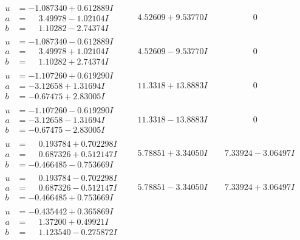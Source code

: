 \documentclass[1p]{elsarticle_modified}
\theoremstyle{definition}
\begin{document}
$$\begin{array}{c|c|c}
\begin{aligned}
u &= -1.087340 + 0.612889 I \\
a &= \phantom{-}3.49978 - 1.02104 I \\
b &= \phantom{-}1.10282 - 2.74374 I\end{aligned}
 & \phantom{-}4.52609 + 9.53770 I & \phantom{-0.000000 } 0 \\ \hline\begin{aligned}
u &= -1.087340 - 0.612889 I \\
a &= \phantom{-}3.49978 + 1.02104 I \\
b &= \phantom{-}1.10282 + 2.74374 I\end{aligned}
 & \phantom{-}4.52609 - 9.53770 I & \phantom{-0.000000 } 0 \\ \hline\begin{aligned}
u &= -1.107260 + 0.619290 I \\
a &= -3.12658 + 1.31694 I \\
b &= -0.67475 + 2.83005 I\end{aligned}
 & \phantom{-}11.3318 + 13.8883 I & \phantom{-0.000000 } 0 \\ \hline\begin{aligned}
u &= -1.107260 - 0.619290 I \\
a &= -3.12658 - 1.31694 I \\
b &= -0.67475 - 2.83005 I\end{aligned}
 & \phantom{-}11.3318 - 13.8883 I & \phantom{-0.000000 } 0 \\ \hline\begin{aligned}
u &= \phantom{-}0.193784 + 0.702298 I \\
a &= \phantom{-}0.687326 + 0.512147 I \\
b &= -0.466485 - 0.753669 I\end{aligned}
 & \phantom{-}5.78851 + 3.34050 I & \phantom{-}7.33924 - 3.06497 I \\ \hline\begin{aligned}
u &= \phantom{-}0.193784 - 0.702298 I \\
a &= \phantom{-}0.687326 - 0.512147 I \\
b &= -0.466485 + 0.753669 I\end{aligned}
 & \phantom{-}5.78851 - 3.34050 I & \phantom{-}7.33924 + 3.06497 I \\ \hline\begin{aligned}
u &= -0.435442 + 0.365869 I \\
a &= \phantom{-}1.37200 + 0.49921 I \\
b &= \phantom{-}1.123540 - 0.275872 I\end{aligned}

\end{array}$$
\end{document}
